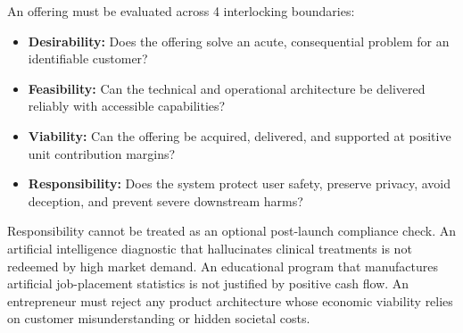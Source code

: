 An offering must be evaluated across 4 interlocking boundaries:
\begin{itemize}
    \item \textbf{Desirability:} Does the offering solve an acute, consequential problem for an identifiable customer?
    \item \textbf{Feasibility:} Can the technical and operational architecture be delivered reliably with accessible capabilities?
    \item \textbf{Viability:} Can the offering be acquired, delivered, and supported at positive unit contribution margins?
    \item \textbf{Responsibility:} Does the system protect user safety, preserve privacy, avoid deception, and prevent severe downstream harms?
\end{itemize}

Responsibility cannot be treated as an optional post-launch compliance check. An artificial intelligence diagnostic that hallucinates clinical treatments is not redeemed by high market demand. An educational program that manufactures artificial job-placement statistics is not justified by positive cash flow. An entrepreneur must reject any product architecture whose economic viability relies on customer misunderstanding or hidden societal costs.
